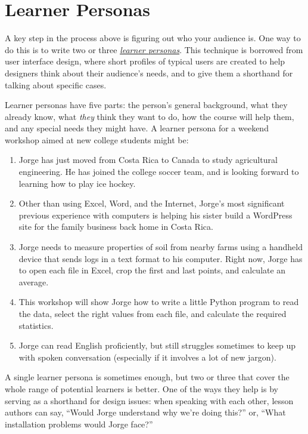 \documentclass[10pt,statementpaper]{memoir}
\begin{document}
\section{Learner Personas}\label{learner-personas}

A key step in the process above is figuring out who your audience is.
One way to do this is to write two or three
\emph{\href{gloss.html\#learner-persona}{learner personas}}. This
technique is borrowed from user interface design, where short profiles
of typical users are created to help designers think about their
audience's needs, and to give them a shorthand for talking about
specific cases.

Learner personas have five parts: the person's general background, what
they already know, what \emph{they} think they want to do, how the
course will help them, and any special needs they might have. A learner
persona for a weekend workshop aimed at new college students might be:

\begin{enumerate}
\def\labelenumi{\arabic{enumi}.}
\item
  Jorge has just moved from Costa Rica to Canada to study agricultural
  engineering. He has joined the college soccer team, and is looking
  forward to learning how to play ice hockey.
\item
  Other than using Excel, Word, and the Internet, Jorge's most
  significant previous experience with computers is helping his sister
  build a WordPress site for the family business back home in Costa
  Rica.
\item
  Jorge needs to measure properties of soil from nearby farms using a
  handheld device that sends logs in a text format to his computer.
  Right now, Jorge has to open each file in Excel, crop the first and
  last points, and calculate an average.
\item
  This workshop will show Jorge how to write a little Python program to
  read the data, select the right values from each file, and calculate
  the required statistics.
\item
  Jorge can read English proficiently, but still struggles sometimes to
  keep up with spoken conversation (especially if it involves a lot of
  new jargon).
\end{enumerate}

A single learner persona is sometimes enough, but two or three that
cover the whole range of potential learners is better. One of the ways
they help is by serving as a shorthand for design issues: when speaking
with each other, lesson authors can say, ``Would Jorge understand why
we're doing this?'' or, ``What installation problems would Jorge face?''
\end{document}
